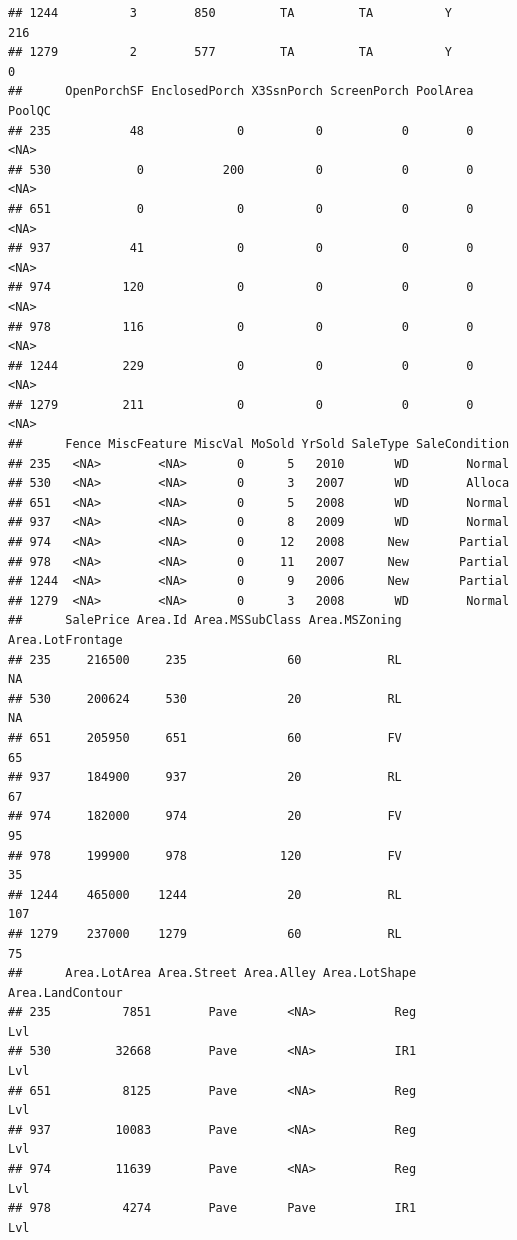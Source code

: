 \documentclass[]{article}
\begin{document}
\begin{verbatim}
## 1244          3        850         TA         TA          Y        216
## 1279          2        577         TA         TA          Y          0
##      OpenPorchSF EnclosedPorch X3SsnPorch ScreenPorch PoolArea PoolQC
## 235           48             0          0           0        0   <NA>
## 530            0           200          0           0        0   <NA>
## 651            0             0          0           0        0   <NA>
## 937           41             0          0           0        0   <NA>
## 974          120             0          0           0        0   <NA>
## 978          116             0          0           0        0   <NA>
## 1244         229             0          0           0        0   <NA>
## 1279         211             0          0           0        0   <NA>
##      Fence MiscFeature MiscVal MoSold YrSold SaleType SaleCondition
## 235   <NA>        <NA>       0      5   2010       WD        Normal
## 530   <NA>        <NA>       0      3   2007       WD        Alloca
## 651   <NA>        <NA>       0      5   2008       WD        Normal
## 937   <NA>        <NA>       0      8   2009       WD        Normal
## 974   <NA>        <NA>       0     12   2008      New       Partial
## 978   <NA>        <NA>       0     11   2007      New       Partial
## 1244  <NA>        <NA>       0      9   2006      New       Partial
## 1279  <NA>        <NA>       0      3   2008       WD        Normal
##      SalePrice Area.Id Area.MSSubClass Area.MSZoning Area.LotFrontage
## 235     216500     235              60            RL               NA
## 530     200624     530              20            RL               NA
## 651     205950     651              60            FV               65
## 937     184900     937              20            RL               67
## 974     182000     974              20            FV               95
## 978     199900     978             120            FV               35
## 1244    465000    1244              20            RL              107
## 1279    237000    1279              60            RL               75
##      Area.LotArea Area.Street Area.Alley Area.LotShape Area.LandContour
## 235          7851        Pave       <NA>           Reg              Lvl
## 530         32668        Pave       <NA>           IR1              Lvl
## 651          8125        Pave       <NA>           Reg              Lvl
## 937         10083        Pave       <NA>           Reg              Lvl
## 974         11639        Pave       <NA>           Reg              Lvl
## 978          4274        Pave       Pave           IR1              Lvl

\end{verbatim}
\end{document}
